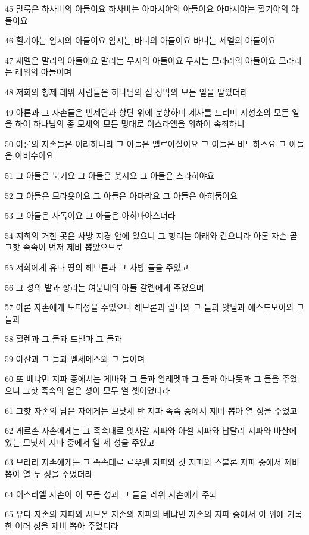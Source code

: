 \par 45 말룩은 하사뱌의 아들이요 하사뱌는 아마시야의 아들이요 아마시야는 힐기야의 아들이요
\par 46 힐기야는 암시의 아들이요 암시는 바니의 아들이요 바니는 세멜의 아들이요
\par 47 세멜은 말리의 아들이요 말리는 무시의 아들이요 무시는 므라리의 아들이요 므라리는 레위의 아들이며
\par 48 저희의 형제 레위 사람들은 하나님의 집 장막의 모든 일을 맡았더라
\par 49 아론과 그 자손들은 번제단과 향단 위에 분향하며 제사를 드리며 지성소의 모든 일을 하여 하나님의 종 모세의 모든 명대로 이스라엘을 위하여 속죄하니
\par 50 아론의 자손들은 이러하니라 그 아들은 엘르아살이요 그 아들은 비느하스요 그 아들은 아비수아요
\par 51 그 아들은 북기요 그 아들은 웃시요 그 아들은 스라히야요
\par 52 그 아들은 므라욧이요 그 아들은 아마랴요 그 아들은 아히둡이요
\par 53 그 아들은 사독이요 그 아들은 아히마아스더라
\par 54 저희의 거한 곳은 사방 지경 안에 있으니 그 향리는 아래와 같으니라 아론 자손 곧 그핫 족속이 먼저 제비 뽑았으므로
\par 55 저희에게 유다 땅의 헤브론과 그 사방 들을 주었고
\par 56 그 성의 밭과 향리는 여분네의 아들 갈렙에게 주었으며
\par 57 아론 자손에게 도피성을 주었으니 헤브론과 립나와 그 들과 얏딜과 에스드모아와 그 들과
\par 58 힐렌과 그 들과 드빌과 그 들과
\par 59 아산과 그 들과 벧세메스와 그 들이며
\par 60 또 베냐민 지파 중에서는 게바와 그 들과 알레멧과 그 들과 아나돗과 그 들을 주었으니 그핫 족속의 얻은 성이 모두 열 셋이었더라
\par 61 그핫 자손의 남은 자에게는 므낫세 반 지파 족속 중에서 제비 뽑아 열 성을 주었고
\par 62 게르손 자손에게는 그 족속대로 잇사갈 지파와 아셀 지파와 납달리 지파와 바산에 있는 므낫세 지파 중에서 열 세 성을 주었고
\par 63 므라리 자손에게는 그 족속대로 르우벤 지파와 갓 지파와 스불론 지파 중에서 제비 뽑아 열 두 성을 주었더라
\par 64 이스라엘 자손이 이 모든 성과 그 들을 레위 자손에게 주되
\par 65 유다 자손의 지파와 시므온 자손의 지파와 베냐민 자손의 지파 중에서 이 위에 기록한 여러 성을 제비 뽑아 주었더라
